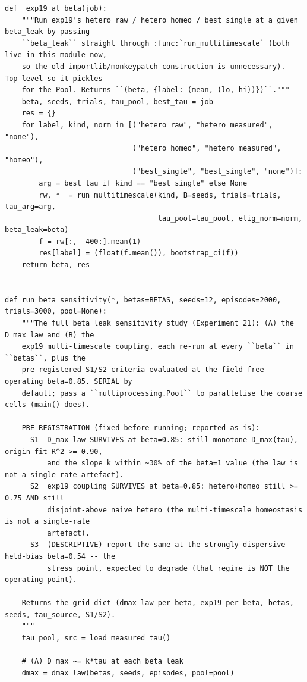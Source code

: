 \begin{lstlisting}[caption={mrl\_trace/extensions.py},label={lst:siox-src-extensions}]
def _exp19_at_beta(job):
    """Run exp19's hetero_raw / hetero_homeo / best_single at a given beta_leak by passing
    ``beta_leak`` straight through :func:`run_multitimescale` (both live in this module now,
    so the old importlib/monkeypatch construction is unnecessary). Top-level so it pickles
    for the Pool. Returns ``(beta, {label: (mean, (lo, hi))})``."""
    beta, seeds, trials, tau_pool, best_tau = job
    res = {}
    for label, kind, norm in [("hetero_raw", "hetero_measured", "none"),
                              ("hetero_homeo", "hetero_measured", "homeo"),
                              ("best_single", "best_single", "none")]:
        arg = best_tau if kind == "best_single" else None
        rw, *_ = run_multitimescale(kind, B=seeds, trials=trials, tau_arg=arg,
                                    tau_pool=tau_pool, elig_norm=norm, beta_leak=beta)
        f = rw[:, -400:].mean(1)
        res[label] = (float(f.mean()), bootstrap_ci(f))
    return beta, res


def run_beta_sensitivity(*, betas=BETAS, seeds=12, episodes=2000, trials=3000, pool=None):
    """The full beta_leak sensitivity study (Experiment 21): (A) the D_max law and (B) the
    exp19 multi-timescale coupling, each re-run at every ``beta`` in ``betas``, plus the
    pre-registered S1/S2 criteria evaluated at the field-free operating beta=0.85. SERIAL by
    default; pass a ``multiprocessing.Pool`` to parallelise the coarse cells (main() does).

    PRE-REGISTRATION (fixed before running; reported as-is):
      S1  D_max law SURVIVES at beta=0.85: still monotone D_max(tau), origin-fit R^2 >= 0.90,
          and the slope k within ~30% of the beta=1 value (the law is not a single-rate artefact).
      S2  exp19 coupling SURVIVES at beta=0.85: hetero+homeo still >= 0.75 AND still
          disjoint-above naive hetero (the multi-timescale homeostasis is not a single-rate
          artefact).
      S3  (DESCRIPTIVE) report the same at the strongly-dispersive held-bias beta=0.54 -- the
          stress point, expected to degrade (that regime is NOT the operating point).

    Returns the grid dict (dmax law per beta, exp19 per beta, betas, seeds, tau_source, S1/S2).
    """
    tau_pool, src = load_measured_tau()

    # (A) D_max ~= k*tau at each beta_leak
    dmax = dmax_law(betas, seeds, episodes, pool=pool)


\end{lstlisting}
